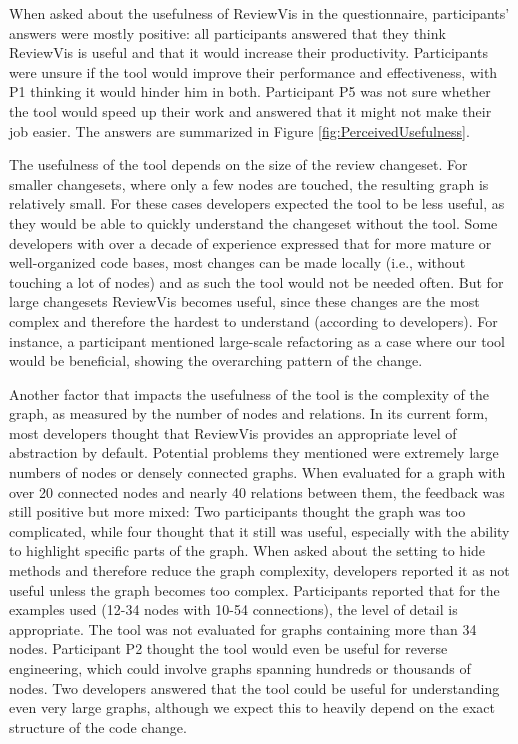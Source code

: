 \documentclass[a4paper,11pt,twoside]{article}
\theoremstyle{definition} %
\begin{document}
When asked about the usefulness of ReviewVis in the questionnaire, participants' answers were mostly positive: all participants answered that they think ReviewVis is useful and that it would increase their productivity. Participants were unsure if the tool would improve their performance and effectiveness, with P1 thinking it would hinder him in both. Participant P5 was not sure whether the tool would speed up their work and answered that it might not make their job easier. The answers are summarized in Figure \ref{fig:PerceivedUsefulness}.

The usefulness of the tool depends on the size of the review changeset. For smaller changesets, where only a few nodes are touched, the resulting graph is relatively small. For these cases developers expected the tool to be less useful, as they would be able to quickly understand the changeset without the tool. Some developers with over a decade of experience expressed that for more mature or well-organized code bases, most changes can be made locally (i.e., without touching a lot of nodes) and as such the tool would not be needed often. But for large changesets ReviewVis becomes useful, since these changes are the most complex and therefore the hardest to understand (according to developers). For instance, a participant mentioned large-scale refactoring as a case where our tool would be beneficial, showing the overarching pattern of the change. 

Another factor that impacts the usefulness of the tool is the complexity of the graph, as measured by the number of nodes and relations. In its current form, most developers thought that ReviewVis provides an appropriate level of abstraction by default. Potential problems they mentioned were extremely large numbers of nodes or densely connected graphs. When evaluated for a graph with over 20 connected nodes and nearly 40 relations between them, the feedback was still positive but more mixed: Two participants thought the graph was too complicated, while four thought that it still was useful, especially with the ability to highlight specific parts of the graph. When asked about the setting to hide methods and therefore reduce the graph complexity, developers reported it as not useful unless the graph becomes too complex. Participants reported that for the examples used (12-34 nodes with 10-54 connections), the level of detail is appropriate. The tool was not evaluated for graphs containing more than 34 nodes. Participant P2 thought the tool would even be useful for reverse engineering, which could involve graphs spanning hundreds or thousands of nodes. Two developers answered that the tool could be useful for understanding even very large graphs, although we expect this to heavily depend on the exact structure of the code change. 
\end{document}
